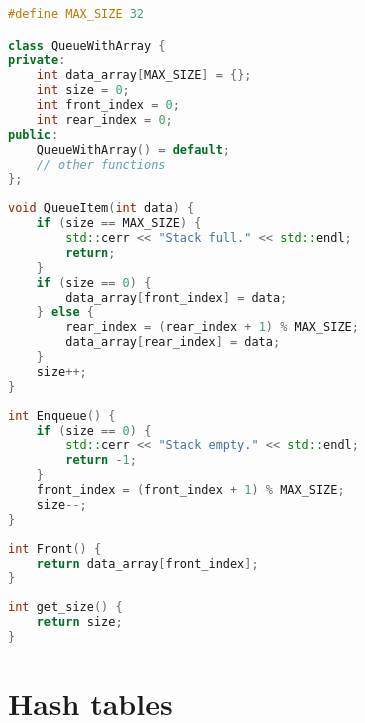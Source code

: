 \begin{lstlisting}[float,
                  language = C++,
                  caption = {Queue data type in C++.},
                  label = {lst:queue_data_type}]
#define MAX_SIZE 32

class QueueWithArray {
private:
    int data_array[MAX_SIZE] = {};
    int size = 0;
    int front_index = 0;
    int rear_index = 0;
public:
    QueueWithArray() = default;
    // other functions
};
\end{lstlisting}

\begin{lstlisting}[float,
                  language = C++,
                  caption = {Queue function for queue data type in C++.},
                  label = {lst:queue_queue}]
void QueueItem(int data) {
    if (size == MAX_SIZE) {
        std::cerr << "Stack full." << std::endl;
        return;
    }
    if (size == 0) {
        data_array[front_index] = data;
    } else {
        rear_index = (rear_index + 1) % MAX_SIZE;
        data_array[rear_index] = data;
    }
    size++;
}
\end{lstlisting}

\begin{lstlisting}[float,
                  language = C++,
                  caption = {Enqueue function for queue data type in C++.},
                  label = {lst:queue_enqueue}]
int Enqueue() {
    if (size == 0) {
        std::cerr << "Stack empty." << std::endl;
        return -1;
    }
    front_index = (front_index + 1) % MAX_SIZE;
    size--;
}
\end{lstlisting}

\begin{lstlisting}[float,
                  language = C++,
                  caption = {Front top element function for queue data type in C++.},
                  label = {lst:queue_get_top}]
int Front() {
    return data_array[front_index];
}
\end{lstlisting}

\begin{lstlisting}[float,
                  language = C++,
                  caption = {Get size function for queue data type in C++.},
                  label = {lst:queue_get_size}]
int get_size() {
    return size;
}
\end{lstlisting}


\section{Hash tables}

